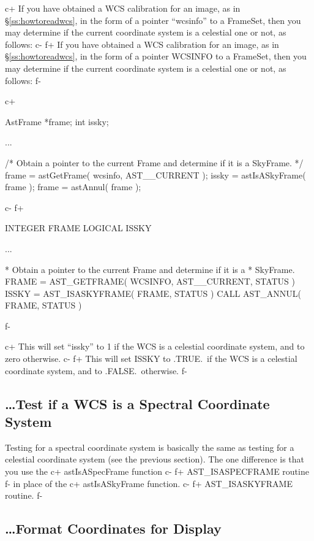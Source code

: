 \documentclass[twoside,11pt]{starlink}
\providecommand{\secref}[1]{\S\ref{#1}}
\begin{document}
c+
If you have obtained a WCS calibration for an image, as in
\secref{ss:howtoreadwcs}, in the form of a pointer ``wcsinfo'' to a
FrameSet, then you may determine if the current coordinate system is a
celestial one or not, as follows:
c-
f+
If you have obtained a WCS calibration for an image, as in
\secref{ss:howtoreadwcs}, in the form of a pointer WCSINFO to a
FrameSet, then you may determine if the current coordinate system is a
celestial one or not, as follows:
f-

c+
\begin{small}
\begin{terminalv}
AstFrame *frame;
int issky;

...

/* Obtain a pointer to the current Frame and determine if it is a
   SkyFrame. */
frame = astGetFrame( wcsinfo, AST__CURRENT );
issky = astIsASkyFrame( frame );
frame = astAnnul( frame );
\end{terminalv}
\end{small}
c-
f+
\begin{small}
\begin{terminalv}
      INTEGER FRAME
      LOGICAL ISSKY

      ...

*  Obtain a pointer to the current Frame and determine if it is a
*  SkyFrame.
      FRAME = AST_GETFRAME( WCSINFO, AST__CURRENT, STATUS )
      ISSKY = AST_ISASKYFRAME( FRAME, STATUS )
      CALL AST_ANNUL( FRAME, STATUS )
\end{terminalv}
\end{small}
f-

c+
This will set ``issky'' to 1 if the WCS is a celestial coordinate
system, and to zero otherwise.
c-
f+
This will set ISSKY to .TRUE.\ if the WCS is a celestial coordinate
system, and to .FALSE.\ otherwise.
f-

\subsection{\label{ss:howtotestforspectral}\ldots Test if a WCS is a Spectral Coordinate System}
Testing for a spectral coordinate system is basically the same as testing
for a celestial coordinate system (see the previous section). The one
difference is that you use the
c+
astIsASpecFrame function
c-
f+
AST\_ISASPECFRAME routine
f-
in place of the
c+
astIsASkyFrame function.
c-
f+
AST\_ISASKYFRAME routine.
f-

\subsection{\label{ss:howtoformatcoordinates}\ldots Format Coordinates for Display}
\end{document}
